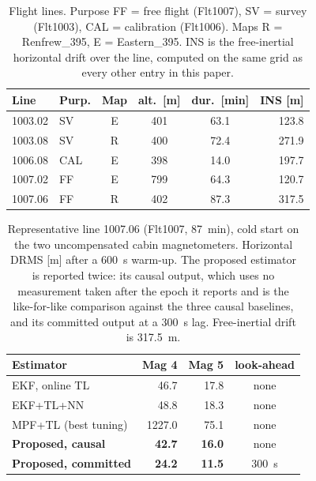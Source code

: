 \begin{table}[t]
\caption{Flight lines. Purpose FF = free flight (Flt1007), SV = survey
(Flt1003), CAL = calibration (Flt1006). Maps R = Renfrew\_395, E =
Eastern\_395. INS is the free-inertial horizontal drift over the line, computed
on the same grid as every other entry in this paper.}
\label{tab:lines}
\centering
\setlength{\tabcolsep}{4pt}
\begin{tabular}{llcccr}
\toprule
Line & Purp. & Map & alt.\ [m] & dur.\ [min] & INS [m] \\
\midrule
1003.02 & SV & E & 401 & 63.1 & 123.8 \\
1003.08 & SV & R & 400 & 72.4 & 271.9 \\
1006.08 & CAL & E & 398 & 14.0 & 197.7 \\
1007.02 & FF & E & 799 & 64.3 & 120.7 \\
1007.06 & FF & R & 402 & 87.3 & 317.5 \\
\bottomrule
\end{tabular}
\end{table}

\begin{table}[t]
\caption{Representative line 1007.06 (Flt1007, \SI{87}{\minute}), cold start on
the two uncompensated cabin magnetometers. Horizontal DRMS [m] after a
\SI{600}{\second} warm-up. The proposed estimator is reported twice: its causal
output, which uses no measurement taken after the epoch it reports and is the
like-for-like comparison against the three causal baselines, and its committed
output at a \SI{300}{\second} lag. Free-inertial drift is \SI{317.5}{\meter}.}
\label{tab:1007}
\centering
\begin{tabular}{lrrc}
\toprule
Estimator & Mag 4 & Mag 5 & look-ahead \\
\midrule
EKF, online TL & 46.7 & 17.8 & none \\
EKF{+}TL{+}NN~\cite{gnadt2022} & 48.8 & 18.3 & none \\
MPF{+}TL (best tuning) & 1227.0 & 75.1 & none \\
\midrule
\textbf{Proposed, causal} & \textbf{42.7} & \textbf{16.0} & none \\
\textbf{Proposed, committed} & \textbf{24.2} & \textbf{11.5} & \SI{300}{\second} \\
\bottomrule
\end{tabular}
\end{table}

